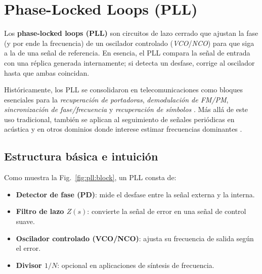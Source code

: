 \newpage
\section{Phase-Locked Loops (PLL)}\label{sec:pll}

Los \textbf{phase-locked loops (PLL)} son circuitos de lazo cerrado que ajustan 
la fase (y por ende la frecuencia) de un oscilador controlado (\emph{VCO}/\emph{NCO}) 
para que siga a la de una señal de referencia.  
En esencia, el PLL compara la señal de entrada con una réplica generada internamente; 
si detecta un desfase, corrige al oscilador hasta que ambas coincidan.

Históricamente, los PLL se consolidaron en telecomunicaciones como bloques esenciales para la
\emph{recuperación de portadoras}, \emph{demodulación de FM/PM}, 
\emph{sincronización de fase/frecuencia} y \emph{recuperación de símbolos} 
\cite{Haykin2001,Proakis2007,Gallager2008}.  
Más allá de este uso tradicional, también se aplican al seguimiento de señales periódicas en acústica y en otros dominios donde interese estimar frecuencias dominantes 
\cite{Han2015}.

\subsection{Estructura básica e intuición}

Como muestra la Fig.~\ref{fig:pll:block}, un PLL consta de:
\begin{itemize}
	\item \textbf{Detector de fase (PD)}: mide el desfase entre la señal externa y la interna.  
	\item \textbf{Filtro de lazo $Z(s)$}: convierte la señal de error en una señal de control suave.  
	\item \textbf{Oscilador controlado (VCO/NCO)}: ajusta su frecuencia de salida según el error.  
	\item \textbf{Divisor $1/N$}: opcional en aplicaciones de síntesis de frecuencia.
\end{itemize}

